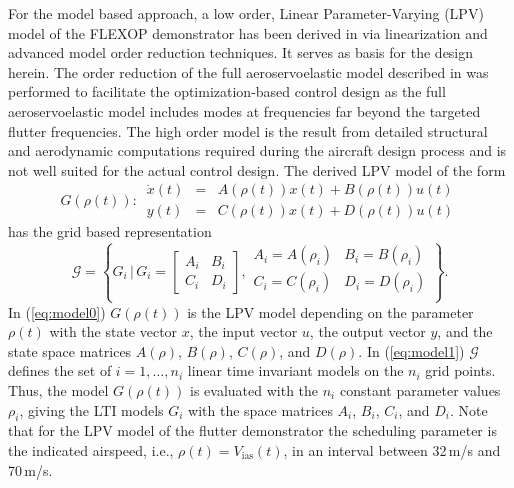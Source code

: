 \documentclass[aerospace,article,submit,moreauthors,pdftex,10pt,a4paper]{Definitions/mdpi}
\begin{document}
For the model based approach, a low order, Linear Parameter-Varying (LPV) model of the FLEXOP demonstrator  has been derived in \cite{luspay18, Luspay18a} via linearization and advanced model order reduction techniques. It serves as basis for the design herein.
The order reduction of the full aeroservoelastic model described in \cite{Wuestenhagen18} was performed to facilitate the optimization-based control design as the full aeroservoelastic model includes modes at frequencies  far beyond the targeted flutter frequencies. The high order model is the result from detailed structural and aerodynamic computations required during the aircraft design process and is not well suited for the actual control design. The derived LPV model of the form
\begin{equation}\label{eq:model0}
G(\rho(t)): \,
\begin{array}{rcl}
\dot x(t) &=& A(\rho(t)) x(t) + B  (\rho(t)) u(t) \\
y(t) &=& C(\rho(t)) x(t) + D(\rho(t)) u(t)
\end{array}
\end{equation}
has the grid based representation
\begin{equation}\label{eq:model1}
{\mathcal{G}} = \left\{ G_i \, | \, G_i = 
\left[
\begin{smallmatrix}
A_i & B_i \\ C_i & D_i
\end{smallmatrix}
\right],
\begin{smallmatrix}
A_i = A(\rho_i)& B_i = B(\rho_i)\\
C_i = C(\rho_i)& D_i = D(\rho_i)\\
\end{smallmatrix}
\right\}.
\end{equation}
In (\ref{eq:model0})  $G(\rho(t))$ is the LPV model depending on the parameter $\rho(t)$ with the state vector $x$, the input vector $u$,  the output vector $y$, and the state space matrices $A(\rho)$, $B(\rho)$, $C(\rho)$, and $D(\rho)$. In (\ref{eq:model1})  $\mathcal{G}$ defines the set of $i=1,\dots,n_i$ linear time invariant models on the $n_i$ grid points. Thus, the model $G(\rho(t))$ is evaluated with the $n_i$ constant parameter values $\rho_i$, giving the LTI models $G_i$  with the space matrices $A_i$, $B_i$, $C_i$, and $D_i$.
Note that for the  LPV model of the flutter demonstrator the scheduling parameter is the indicated airspeed, i.e., $\rho(t) = V_\text{ias}(t)$, in an interval between 32\,m/s and 70\,m/s.
\end{document}
